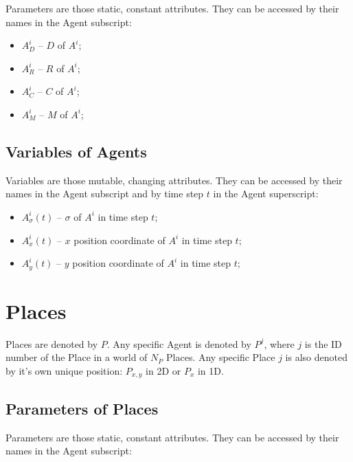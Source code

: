 \documentclass{article}
\begin{document}
\par Parameters are those static, constant attributes. They can be accessed by their names in the Agent subscript:

\begin{itemize}
    \item $A^{i}_{D}$ -- $D$ of $A^{i}$;
    \item $A^{i}_{R}$ -- $R$ of $A^{i}$;
    \item $A^{i}_{C}$ -- $C$ of $A^{i}$;
    \item $A^{i}_{M}$ -- $M$ of $A^{i}$;
\end{itemize}

\subsection{Variables of Agents}

\par Variables are those mutable, changing attributes. They can be accessed by their names in the Agent subscript and by time step $t$ in the Agent superscript: 

\begin{itemize}
    \item $A^{i}_{\sigma}(t)$ -- $\sigma$ of $A^{i}$ in time step $t$;
    \item $A^{i}_{x}(t)$ -- $x$ position coordinate of $A^{i}$ in time step $t$;
    \item $A^{i}_{y}(t)$ -- $y$ position coordinate of $A^{i}$ in time step $t$;
\end{itemize}


\section{Places}

\par Places are denoted by $P$. Any specific Agent is denoted by $P^{j}$, where $j$ is the ID number of the Place in a world of $N_P$ Places. Any specific Place $j$ is also denoted by it's own unique position: $P_{x,y}$ in 2D or $P_{x}$ in 1D.

\subsection{Parameters of Places}

\par Parameters are those static, constant attributes. They can be accessed by their names in the Agent subscript:
\end{document}
